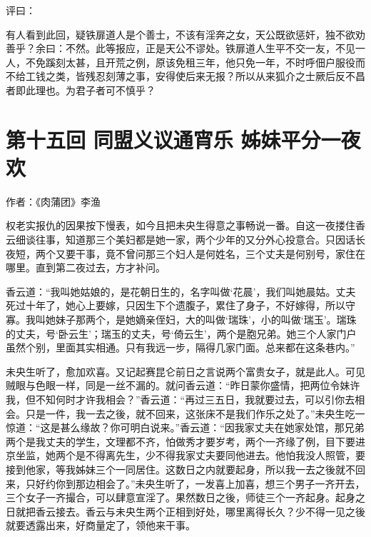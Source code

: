 \documentclass[a4paper,12pt,UTF8,twoside]{ctexbook}
\begin{document}
评曰：

有人看到此回，疑铁扉道人是个善士，不该有淫奔之女，天公既欲惩奸，独不欲劝善乎？余曰：不然。此等报应，正是天公不谬处。铁扉道人生平不交一友，不见一人，不免蹊刻太甚，且开荒之例，原该免租三年，他只免一年，不时呼佃户服役而不给工钱之类，皆残忍刻薄之事，安得使后来无报？所以从来狐介之士厥后反不昌者即此理也。为君子者可不慎乎？

\chapter{第十五回 同盟义议通宵乐 姊妹平分一夜欢}

作者：《肉蒲团》李渔

权老实报仇的因果按下慢表，如今且把未央生得意之事畅说一番。自这一夜搂住香云细谈往事，知道那三个美妇都是她一家，两个少年的又分外心投意合。只因话长夜短，两个又要干事，竟不曾问那三个妇人是何姓名，三个丈夫是何别号，家住在哪里。直到第二夜过去，方才补问。

香云道：“我叫她姑娘的，是花朝日生的，名字叫做‘花晨’，我们叫她晨姑。丈夫死过十年了，她心上要嫁，只因生下个遗腹子，累住了身子，不好嫁得，所以守寡。我叫她妹子那两个，是她嫡亲侄妇，大的叫做‘瑞珠’，小的叫做‘瑞玉’。瑞珠的丈夫，号‘卧云生’；瑞玉的丈夫，号‘倚云生’，两个是胞兄弟。她三个人家门户虽然个别，里面其实相通。只有我远一步，隔得几家门面。总来都在这条巷内。”

未央生听了，愈加欢喜。又记起赛昆仑前日之言说两个富贵女子，就是此人。可见贼眼与色眼一样，同是一丝不漏的。就问香云道：“昨日蒙你盛情，把两位令妹许我，但不知何时才许我相会？”香云道：“再过三五日，我就要过去，可以引你去相会。只是一件，我一去之後，就不回来，这张床不是我们作乐之处了。”未央生吃一惊道：“这是甚么缘故？你可明白说来。”香云道：“因我家丈夫在她家处馆，那兄弟两个是我丈夫的学生，文理都不齐，怕做秀才要岁考，两个一齐缘了例，目下要进京坐监，她两个是不得离先生，少不得我家丈夫要同他进去。他怕我没人照管，要接到他家，等我姊妹三个一同居住。这数日之内就要起身，所以我一去之後就不回来，只好约你到那边相会了。”未央生听了，一发喜上加喜，想三个男子一齐开去，三个女子一齐撮合，可以肆意宣淫了。果然数日之後，师徒三个一齐起身。起身之日就把香云接去。香云与未央生两个正相到好处，哪里离得长久？少不得一见之後就要透露出来，好商量定了，领他来干事。
\end{document}

